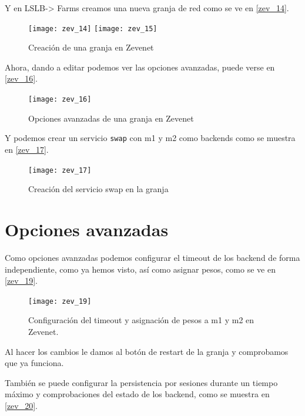 Y en LSLB-> Farms creamos una nueva granja de red como se ve en \eqref{zev_14}.

\begin{figure}[h!]
\begin{center}
\caption{Creación de una granja en Zevenet}
\label{zev_14}
\texttt{[image: zev\_14]}
\texttt{[image: zev\_15]}
\end{center}
\end{figure}

Ahora, dando a editar podemos ver las opciones avanzadas, puede verse en \eqref{zev_16}. 

\begin{figure}[h!]
\begin{center}
\caption{Opciones avanzadas de una granja en Zevenet}
\label{zev_16}
\texttt{[image: zev\_16]}
\end{center}
\end{figure}

Y podemos crear un servicio \verb|swap| con m1 y m2 como backends como se muestra en \eqref{zev_17}.

\begin{figure}[h!]
\begin{center}
\caption{Creación del servicio swap en la granja}
\label{zev_17}
\texttt{[image: zev\_17]}
\end{center}
\end{figure}

\section{Opciones avanzadas}

Como opciones avanzadas podemos configurar el timeout de los backend de forma independiente, como ya hemos visto, así como asignar pesos, como se ve en \eqref{zev_19}.

\begin{figure}[h!]
\begin{center}
\caption{Configuración del timeout y asignación de pesos a m1 y m2 en Zevenet.}
\label{zev_19}
\texttt{[image: zev\_19]}
\end{center}
\end{figure}

Al hacer los cambios le damos al botón de restart de la granja y comprobamos que ya funciona.

También se puede configurar la persistencia por sesiones durante un tiempo máximo y comprobaciones del estado de los backend, como se muestra en \eqref{zev_20}.

